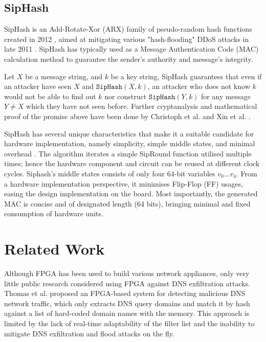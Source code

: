 \documentclass[a4paper]{report}
\newcommand{\code}{\texttt}
\begin{document}
\subsection{SipHash}
\label{section:background-siphash}

SipHash is an Add-Rotate-Xor (ARX) family of pseudo-random hash functions created in 2012 \cite{aumasson-bernstein-2012}, aimed at mitigating various "hash-flooding" DDoS attacks in late 2011 \cite{lennon-2011}. SipHash has typically used as a Message Authentication Code (MAC) calculation method to guarantee the sender's authority and message's integrity. 

Let $X$ be a message string, and $k$ be a key string, SipHash guarantees that even if an attacker have seen $X$ and $\code{SipHash}(X, k)$, an attacker who does not know $k$ would not be able to find out $k$ nor construct $\code{SipHash}(Y, k)$ for any message $Y \neq X$ which they have not seen before. Further cryptanalysis and mathematical proof of the promise above have been done by Christoph et al. \cite{dobraunig-2014} and Xin et al. \cite{xin-2019}.

SipHash has several unique characteristics that make it a suitable candidate for hardware implementation, namely simplicity, simple middle states, and minimal overhead \cite{aumasson-bernstein-2012}. The algorithm iterates a simple SipRound function utilised multiple times; hence the hardware component and circuit can be reused at different clock cycles. Siphash's middle states consists of only four 64-bit variables $v_0 ... v_4$. From a hardware implementation perspective, it minimises Flip-Flop (FF) usages, easing the design implementation on the board. Most importantly, the generated MAC is concise and of designated length (64 bits), bringing minimal and fixed consumption of hardware units.

\section{Related Work}

Although FPGA has been used to build various network appliances, only very little public research considered using FPGA against DNS exfiltration attacks. Thomas et al. \cite{thomas-2011} proposed an FPGA-based system for detecting malicious DNS network traffic, which only extracts DNS query domains and match it by hash against a list of hard-coded domain names with the memory. This approach is limited by the lack of real-time adaptability of the filter list and the inability to mitigate DNS exfiltration and flood attacks on the fly. 
\end{document}
